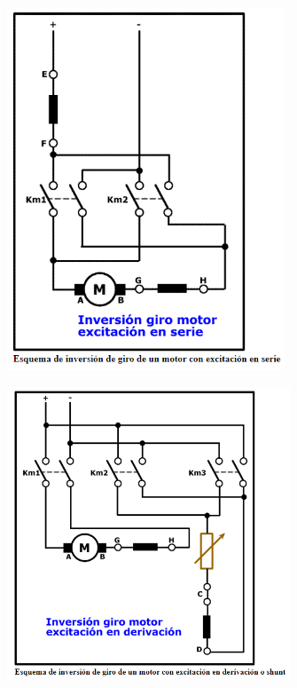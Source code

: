 \documentclass[12pt]{article}
\begin{document}
\begin{figure}[H]
	\begin{Center}
		\includegraphics[width=3.26in,height=4.26in]{./media/image4.png}
	\end{Center}
\end{figure}



\par




\begin{figure}[H]
	\begin{Center}
		\includegraphics[width=3.32in,height=3.45in]{./media/image5.png}
	\end{Center}
\end{figure}



\par


\printbibliography
\end{document}
